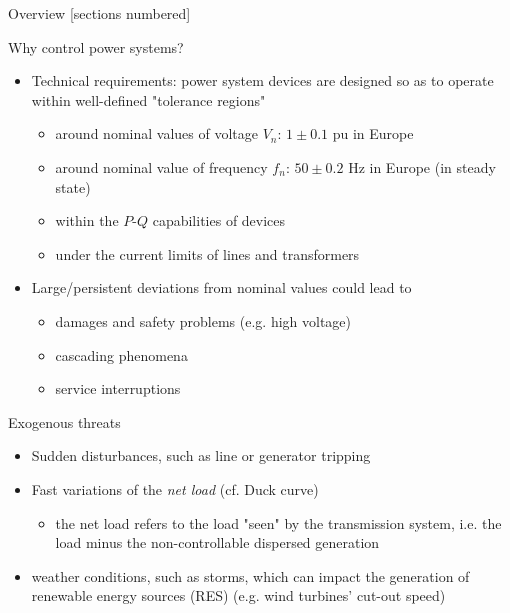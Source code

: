 \titleframe

\begin{frame}{Overview}
  [sections numbered]
  \tableofcontents[hideallsubsections]
\end{frame}





\begin{frame}{Why control power systems?}
  \begin{itemize}
      \item Technical requirements: power system devices are designed so as to operate within well-defined "tolerance regions" 
      \begin{itemize}
        \item around nominal values of voltage $V_n$: $1 \pm 0.1$ pu in Europe
        \item around nominal value of frequency $f_n$: $50 \pm 0.2$  Hz in Europe (in steady state)
        \item within the $P$-$Q$ capabilities of devices
        \item under the current limits of lines and transformers
      \end{itemize} 
      \item Large/persistent deviations from nominal values could lead to 
      \begin{itemize}
        \item damages and safety problems (e.g. high voltage)
        \item cascading phenomena
        \item service interruptions
      \end{itemize}
      
  \end{itemize}
\end{frame}

\begin{frame}{Exogenous threats}
  \begin{itemize}
      \item Sudden disturbances, such as line or generator tripping
      \item Fast variations of the \textit{net load} (cf. Duck curve)
      \begin{itemize}
        \item the net load refers to the load "seen" by the transmission system, i.e. the load minus the non-controllable dispersed generation
      \end{itemize}
      \item weather conditions, such as storms, which can impact the generation of renewable energy sources (RES) (e.g. wind turbines' cut-out speed)
  \end{itemize}
\end{frame}


